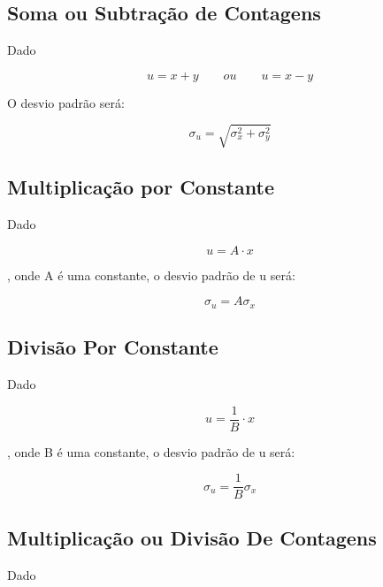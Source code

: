 \documentclass[11pt,a4paper]{article}
\begin{document}
		
	\subsection{Soma ou Subtração de Contagens}

		Dado 

			\begin{equation*}
				u = x + y \qquad ou \qquad u = x - y
			\end{equation*}


		\noindent O desvio padrão será:

			\begin{equation}
				\sigma_u = \sqrt{\sigma_x^2 + \sigma_y^2} 
			\end{equation}
		
	\subsection{Multiplicação por Constante}

		Dado 

			\begin{equation*}
				u = A \cdot x
			\end{equation*}

		\noindent, onde A é uma constante, o desvio padrão de u será:

			\begin{equation}
				\sigma_u = A \sigma_x
			\end{equation}

	\subsection{Divisão Por Constante}

		Dado 

			\begin{equation*}
				u =\frac{1}{B} \cdot x
			\end{equation*}

		\noindent, onde B é uma constante, o desvio padrão de u será:

			\begin{equation}
				\sigma_u = \frac{1}{B} \sigma_x
			\end{equation}
		
	\subsection{Multiplicação ou Divisão De Contagens}

		Dado 
\end{document}
